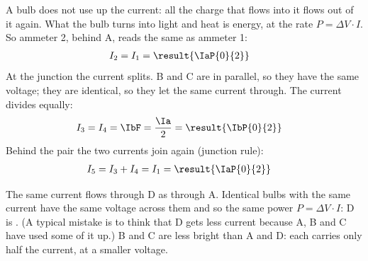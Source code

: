 \begin{abcliste}
\abc A bulb does not use up the current: all the charge that flows into it flows out of it again. What the bulb turns into light and heat is energy, at the rate $P = \Delta V\cdot I$. So ammeter 2, behind A, reads the same as ammeter 1:
\begin{align}
 I_2 &= I_1 = \result{\IaP{0}{2}}
\end{align}
At the junction the current splits. B and C are in parallel, so they have the same voltage; they are identical, so they let the same current through. The current divides equally:
\begin{align}
 I_3 = I_4 &= \IbF = \frac{\Ia}{2} = \result{\IbP{0}{2}}
\end{align}
Behind the pair the two currents join again (junction rule):
\begin{align}
 I_5 &= I_3 + I_4 = I_1 = \result{\IaP{0}{2}}
\end{align}

\abc The same current flows through D as through A. Identical bulbs with the same current have the same voltage across them and so the same power $P = \Delta V\cdot I$: D is . (A typical mistake is to think that D gets less current because A, B and C have used some of it up.) B and C are less bright than A and D: each carries only half the current, at a smaller voltage.
\end{abcliste}

